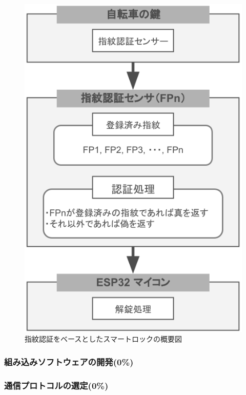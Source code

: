           \begin{figure}[htbp]
            \centering
            \includegraphics[scale=0.46]
            {figures/overallImageOfFingerprintUnlock.png}
            \caption{指紋認証をベースとしたスマートロックの概要図}
            \label{fig:指紋認証をベースとしたスマートロックの概要図}
          \end{figure}
          
          
      \subsubsection{組み込みソフトウェアの開発(0\%)}
        \label{sec:組み込みソフトウェアの開発}
          \par
          
      \subsubsection{通信プロトコルの選定(0\%)}
        \label{sec:通信プロトコルの選定}
          \par
          
